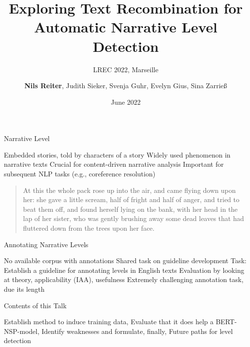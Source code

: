\documentclass[aspectratio=169]{beamer}
\title[Narrative Level Detection]{Exploring Text Recombination for Automatic Narrative Level Detection}
\subtitle{LREC 2022, Marseille}
\author[]{\textbf{Nils Reiter}, Judith Sieker, Svenja Guhr, Evelyn Gius, Sina Zarrieß}
\date[]{June 2022}
\begin{document}
\maketitleframe

\begin{frame}{Narrative Level}
\begin{outline}
\1 Embedded stories, told by characters of a story
\1 Widely used phenomenon in narrative texts
\1 Crucial for content-driven narrative analysis
\1 Important for subsequent NLP tasks (e.g., coreference resolution)
\end{outline}
\pause
\begin{example}
\begin{quote}
At this the whole pack rose up into the air, and came flying down upon her: she gave a little scream, half of fright and half of anger, and tried to beat them off, \faExclamationTriangle{} and found herself lying on the bank, with her head in the lap of her sister, who was gently brushing away some dead leaves that had fluttered down from the trees upon her face.
\end{quote}
\end{example}
\end{frame}

\begin{frame}{Annotating Narrative Levels}
\begin{outline}
\1 No available corpus with annotations
\1 Shared task on guideline development 
\2 Task: Establish a guideline for annotating levels in English texts
\2 Evaluation by looking at theory, applicability (IAA), usefulness
\2 Extremely challenging annotation task, due its length
\end{outline}

\pause

\begin{block}{Contents of this Talk}
\begin{outline}
\1 Establish method to induce training data,
\1 Evaluate that it does help a BERT-NSP-model,
\1 Identify weaknesses and formulate, finally,
\1 Future paths for level detection
\end{outline}
\end{block}
\end{frame}
\end{document}
